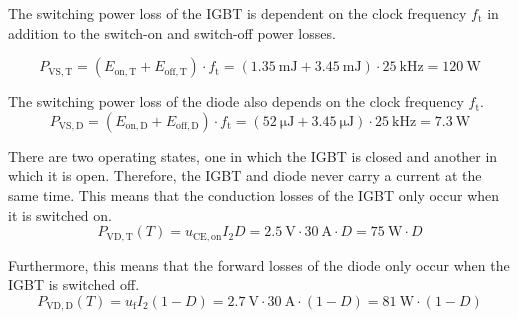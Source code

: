 
\begin{solutionblock}
The switching power loss of the IGBT is dependent on the clock frequency $f_{\mathrm{t}}$ in addition to the switch-on and switch-off power losses.

\begin{equation}
    P_{\mathrm{VS,T}} =  (E_{\mathrm{on,T}} +  E_{\mathrm{off,T}}) \cdot f_{\mathrm{t}} = (\SI {1.35}{\milli\joule} + \SI {3.45}{\milli\joule}) \cdot \SI {25}{\kilo\hertz} = \SI {120}{\watt}
 \end{equation}

 The switching power loss of the diode also depends on the clock frequency $f_{\mathrm{t}}$.
 \begin{equation}
    P_{\mathrm{VS,D}} =  (E_{\mathrm{on,D}} +  E_{\mathrm{off,D}}) \cdot f_{\mathrm{t}} = (\SI {52}{\micro\joule} + \SI {3.45}{\micro\joule}) \cdot \SI {25}{\kilo\hertz} = \SI {7.3}{\watt}
 \end{equation}
\end{solutionblock}

\begin{solutionblock}
    There are two operating states, one in which the IGBT is closed and another in which it is open. Therefore, the IGBT and diode never carry a current at the same time. This means that the conduction losses of the IGBT only occur when it is switched on.
    \begin{equation}
P_{\mathrm{VD,T}}(T) = u_{\mathrm{CE,on}} I_2  D = \SI {2.5}{\volt}\cdot \SI {30}{\ampere} \cdot D = \SI {75}{\watt} \cdot D
    \end{equation}

    Furthermore, this means that the forward losses of the diode only occur when the IGBT is switched off.
    \begin{equation}
    P_{\mathrm{VD,D}}(T) = u_{\mathrm{f}} I_2 (1-D)= \SI {2.7}{\volt}\cdot \SI {30}{\ampere} \cdot (1-D) = \SI {81}{\watt} \cdot (1-D)
    \end{equation}
\end{solutionblock}

